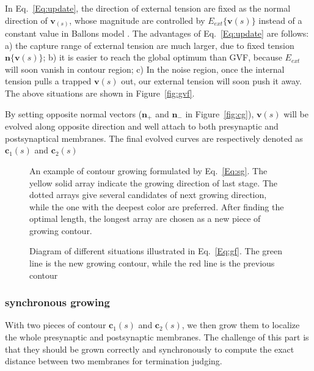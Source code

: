 In Eq.~\ref{Eq:update}, the direction of external tension are fixed as the normal direction of $\mathbf{v}_(s)$, whose magnitude are controlled by $E_{ext}\{\mathbf{v}(s)\}$ instead of a constant value in Ballons model \cite{Cohen1991}.
The advantages of Eq.~\ref{Eq:update} are follows:
a) the capture range of external tension are much larger, due to fixed tension $\mathbf{n}\{\mathbf{v}(s)\}$;
b) it is easier to reach the global optimum than GVF, because $E_{ext}$ will soon vanish in contour region;
c) In the noise region, once the internal tension pulls a trapped $\mathbf{v}(s)$ out, our external tension will soon push it away.
The above situations are shown in Figure~\ref{fig:gvf}.

By setting opposite normal vectors ($\mathbf{n}_{+}$ and $\mathbf{n}_{-}$ in Figure~\ref{fig:cg}), $\mathbf{v}(s)$ will be evolved along opposite direction and well attach to both presynaptic and postsynaptical membranes.
The final evolved curves are respectively denoted as $\mathbf{c}_1(s)$ and $\mathbf{c}_2(s)$

\begin{figure}[t]
\begin{minipage}[b]{1.0\linewidth}
  \centering
 \centerline{}
\end{minipage}
\caption{An example of contour growing formulated by Eq.~\ref{Eq:sg}.
        The yellow solid array indicate the growing direction of last stage.
        The dotted arrays give several candidates of next growing direction, while the one with the deepest color are preferred.
        After finding the optimal length, the longest array are chosen as a new piece of growing contour.}
\label{fig:g}
\end{figure}

\begin{figure}[t]
\begin{minipage}[b]{1.0\linewidth}
  \centering
 \centerline{}
\end{minipage}
\caption{Diagram of different situations illustrated in Eq.~\ref{Eq:gf}.
        The green line is the new growing contour, while the red line is the previous contour}
\label{fig:sg}
\end{figure}
\subsubsection{synchronous growing}
With two pieces of contour $\mathbf{c}_1(s)$ and $\mathbf{c}_2(s)$, we then grow them to localize the whole presynaptic and postsynaptic membranes.
The challenge of this part is that they should be grown correctly and synchronously to compute the exact distance between two membranes for termination judging.

